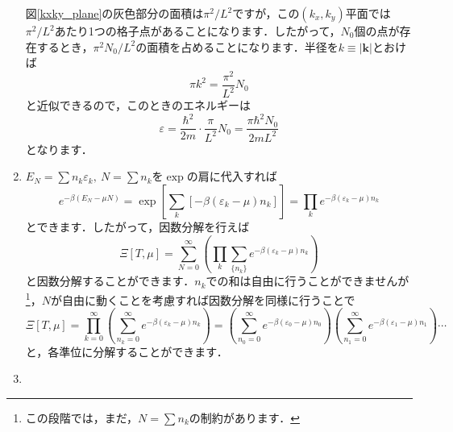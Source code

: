 \documentclass[a4paper,pdflatex,ja=standard]{bxjsarticle}
\begin{document}
\begin{enumerate}
  図\ref{kxky_plane}の灰色部分の面積は$\pi^2/L^2$ですが，この$(k_x,k_y)$平面では$\pi^2/L^2$あたり1つの格子点があることになります．したがって，$N_0$個の点が存在するとき，$\pi^2 N_0/L^2$の面積を占めることになります．半径を$k\equiv|\bm{k}|$とおけば
  \begin{equation}
    \pi k^2
    =
    \frac{\pi^2}{L^2}N_0
  \end{equation}
  と近似できるので，このときのエネルギーは
  \begin{equation}
    \varepsilon
    =
    \frac{\hbar^2}{2m}
    \cdot
    \frac{\pi}{L^2}N_0    
    =
    \frac{\pi\hbar^2 N_0}{2mL^2}
  \end{equation}
  となります．


  \item 

  $E_N=\sum n_k\varepsilon_k,\ N=\sum n_k$を$\exp$の肩に代入すれば
  \begin{equation}
    e^{-\beta(E_N-\mu N)}
    =
    \exp\left[  
      \sum_{k}[-\beta(\varepsilon_k-\mu)n_k]
    \right]
    =
    \prod_{k}
    e^{-\beta(\varepsilon_k-\mu)n_k}
  \end{equation}
  とできます．したがって，因数分解を行えば
  \begin{equation}
    \Xi[T,\mu]
    =
    \sum_{N=0}^{\infty}
    \left(  
      \prod_{k}
      \sum_{\{n_k\}}
      e^{-\beta(\varepsilon_k-\mu)n_k}
    \right)
  \end{equation}
  と因数分解することができます．$n_k$での和は自由に行うことができませんが\footnote{
    この段階では，まだ，$N=\sum n_k$の制約があります．
  }，$N$が自由に動くことを考慮すれば因数分解を同様に行うことで
  \begin{equation}
    \Xi[T,\mu]
    =
    \prod_{k=0}^{\infty}
    \left(  
      \sum_{n_k=0}^{\infty}
      e^{-\beta(\varepsilon_k-\mu)n_k}
    \right)
    =
    \left(  
      \sum_{n_0=0}^{\infty}
      e^{-\beta(\varepsilon_0-\mu)n_0}      
    \right)
    \left(  
      \sum_{n_1=0}^{\infty}
      e^{-\beta(\varepsilon_1-\mu)n_1}      
    \right)
    \cdots
  \end{equation}
  と，各準位に分解することができます．


  \item 


\end{enumerate}
\end{document}
